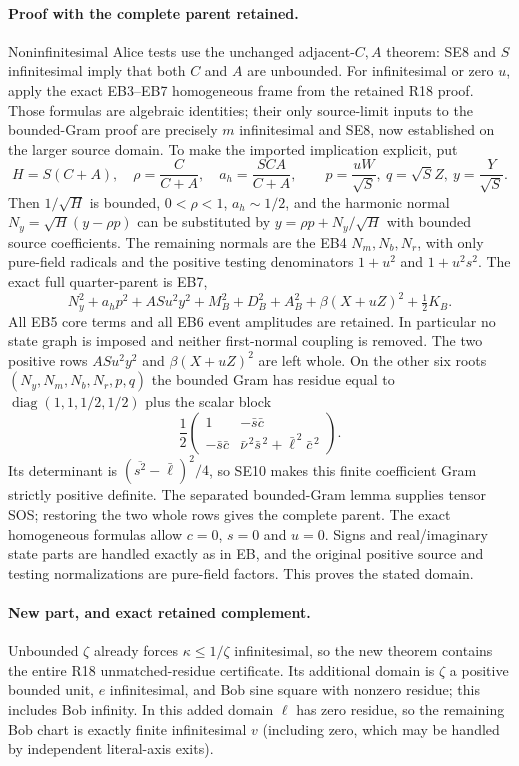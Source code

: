 \paragraph{Proof with the complete parent retained.}
Noninfinitesimal Alice tests use the unchanged adjacent-$C,A$ theorem:
SE8 and $S$ infinitesimal imply that both $C$ and $A$ are unbounded.
For infinitesimal or zero $u$, apply the exact EB3--EB7 homogeneous
frame from the retained R18 proof. Those formulas are algebraic identities;
their only source-limit inputs to the bounded-Gram proof are precisely
$m$ infinitesimal and SE8, now established on the larger source domain.
To make the imported implication explicit, put
\[
 H=S(C+A),\quad \rho=\frac C{C+A},\quad a_h=\frac{SCA}{C+A},
 \qquad p=\frac{uW}{\sqrt S},\ q=\sqrt S Z,\ y=\frac Y{\sqrt S}.
\]
Then $1/\sqrt H$ is bounded, $0<\rho<1$, $a_h\sim1/2$, and
the harmonic normal $N_y=\sqrt H(y-\rho p)$ can be substituted
by $y=\rho p+N_y/\sqrt H$ with bounded source coefficients.
The remaining normals are the EB4 $N_m,N_b,N_r$, with only pure-field
radicals and the positive testing denominators $1+u^2$ and $1+u^2s^2$.
The exact full quarter-parent is EB7,
\[
 N_y^2+a_hp^2+ASu^2y^2+M_B^2+D_B^2+A_B^2+\beta(X+uZ)^2
                         +\tfrac12 K_B.\tag{SE11}
\]
All EB5 core terms and all EB6 event amplitudes are retained. In particular
no state graph is imposed and neither first-normal coupling is removed.
The two positive rows $ASu^2y^2$ and $\beta(X+uZ)^2$ are left whole.
On the other six roots $(N_y,N_m,N_b,N_r,p,q)$ the bounded Gram has
residue equal to $\operatorname{diag}(1,1,1/2,1/2)$ plus the scalar block
\[
 \frac12\begin{pmatrix}
 1&-\bar s\bar c\\
 -\bar s\bar c&\bar\nu^{\,2}\bar s^{\,2}
                            +\bar\ell^{\,2}\bar c^{\,2}
 \end{pmatrix}.
\tag{SE12}
\]
Its determinant is $(\overline{s^2}-\bar\ell)^2/4$, so SE10
makes this finite coefficient Gram strictly positive definite. The
separated bounded-Gram lemma supplies tensor SOS; restoring the two
whole rows gives the complete parent. The exact homogeneous formulas
allow $c=0$, $s=0$ and $u=0$. Signs and real/imaginary state parts are
handled exactly as in EB, and the original positive source and testing
normalizations are pure-field factors. This proves the stated domain.

\paragraph{New part, and exact retained complement.}
Unbounded $\zeta$ already forces $\kappa\le1/\zeta$ infinitesimal,
so the new theorem contains the entire R18 unmatched-residue certificate.
Its additional domain is $\zeta$ a positive bounded unit, $e$
infinitesimal, and Bob sine square with nonzero residue; this includes
Bob infinity. In this added domain $\ell$ has zero residue, so the
remaining Bob chart is exactly finite infinitesimal $v$ (including zero,
which may be handled by independent literal-axis exits).

